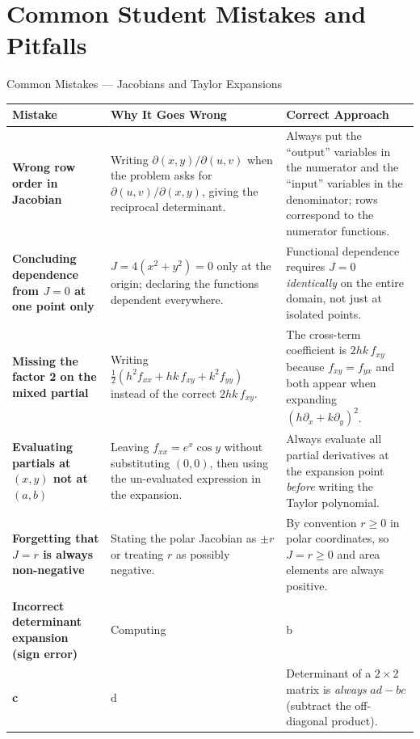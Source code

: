 \documentclass[12pt,a4paper]{article}
\begin{document}
\section{Common Student Mistakes and Pitfalls}

\begin{mistakebox}{Common Mistakes --- Jacobians and Taylor Expansions}
\begin{tabular}{>{\bfseries}p{3.8cm} p{5cm} p{5cm}}
\toprule
Mistake & Why It Goes Wrong & Correct Approach \\
\midrule
Wrong row order in Jacobian &
  Writing \( \partial(x,y)/\partial(u,v) \) when the problem asks for \( \partial(u,v)/\partial(x,y) \), giving the reciprocal determinant. &
  Always put the ``output'' variables in the numerator and the ``input'' variables in the denominator; rows correspond to the numerator functions. \\[6pt]
Concluding dependence from \( J=0 \) at one point only &
  \( J = 4(x^{2}+y^{2}) = 0 \) only at the origin; declaring the functions dependent everywhere. &
  Functional dependence requires \( J = 0 \) \emph{identically} on the entire domain, not just at isolated points. \\[6pt]
Missing the factor 2 on the mixed partial &
  Writing \( \tfrac{1}{2}(h^2 f_{xx} + hk\,f_{xy} + k^2 f_{yy}) \) instead of the correct \( 2hk\,f_{xy} \). &
  The cross-term coefficient is \( 2hk\,f_{xy} \) because \( f_{xy} = f_{yx} \) and both appear when expanding \( (h\partial_x+k\partial_y)^2 \). \\[6pt]
Evaluating partials at \( (x,y) \) not at \( (a,b) \) &
  Leaving \( f_{xx} = e^{x}\cos y \) without substituting \( (0,0) \), then using the un-evaluated expression in the expansion. &
  Always evaluate all partial derivatives at the expansion point \emph{before} writing the Taylor polynomial. \\[6pt]
Forgetting that \( J = r \) is always non-negative &
  Stating the polar Jacobian as \( \pm r \) or treating \( r \) as possibly negative. &
  By convention \( r \geq 0 \) in polar coordinates, so \( J = r \geq 0 \) and area elements are always positive. \\[6pt]
Incorrect determinant expansion (sign error) &
  Computing \( \begin{vmatrix} a & b \\ c & d \end{vmatrix} = ad + bc \) instead of \( ad - bc \). &
  Determinant of a \( 2\times 2 \) matrix is \emph{always} \( ad - bc \) (subtract the off-diagonal product). \\
\bottomrule
\end{tabular}
\end{mistakebox}
\end{document}
